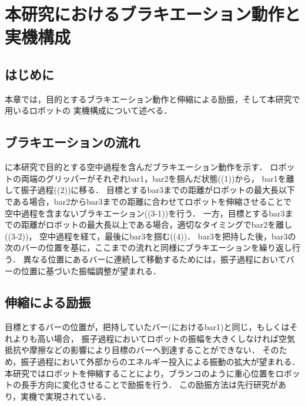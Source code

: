 \chapter[本研究におけるブラキエーション動作と実機構成]%
        {本研究におけるブラキエーション動作と\\実機構成}
        \section{はじめに}
          
          本章では，目的とするブラキエーション動作と伸縮による励振，そして本研究で用いるロボットの
          実機構成について述べる．


        \section{ブラキエーションの流れ}

          に本研究で目的とする空中過程を含んだブラキエーション動作を示す．
          ロボットの両端のグリッパーがそれぞれbar1，bar2を掴んだ状態((1))から，
          bar1を離して振子過程((2))に移る．
          目標とするbar3までの距離がロボットの最大長以下である場合，bar2からbar3までの距離に合わせてロボットを伸縮させることで
          空中過程を含まないブラキエーション((3-1))を行う．
          一方，目標とするbar3までの距離がロボットの最大長以上である場合，適切なタイミングでbar2を離し((3-2))，
          空中過程を経て，最後にbar3を掴む((4))．
          bar3を把持した後，bar3の次のバーの位置を基に，ここまでの流れと同様にブラキエーションを繰り返し行う．
          異なる位置にあるバーに連続して移動するためには，振子過程においてバーの位置に基づいた振幅調整が望まれる．

        
        \section{伸縮による励振}
          
          目標とするバーの位置が，把持していたバー(におけるbar1)と同じ，もしくはそれよりも高い場合，
          振子過程においてロボットの振幅を大きくしなければ空気抵抗や摩擦などの影響により目標のバーへ到達することができない．
          そのため，振子過程において外部からのエネルギー投入による振動の拡大が望まれる．
          本研究ではロボットを伸縮することにより，ブランコのように重心位置をロボットの長手方向に変化させることで励振を行う．
          この励振方法は先行研究があり，実機で実現されている\cite{Hijiri:Robomech2024}．
